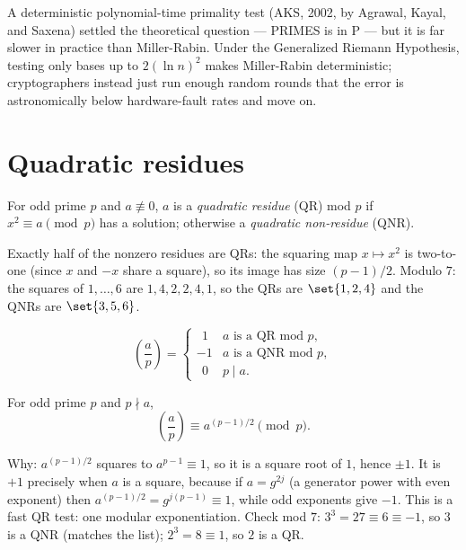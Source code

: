 \begin{historybox}
A deterministic polynomial-time primality test (AKS, 2002, by Agrawal, Kayal, and Saxena) settled the
theoretical question --- PRIMES is in P --- but it is far slower in practice than Miller-Rabin. Under
the Generalized Riemann Hypothesis, testing only bases up to $2(\ln n)^2$ makes Miller-Rabin
deterministic; cryptographers instead just run enough random rounds that the error is astronomically
below hardware-fault rates and move on.
\end{historybox}

\section{Quadratic residues}
\label{ch40:qr}

\begin{definition}
\label{ch40:def-qr}
For odd prime $p$ and $a\not\equiv 0$, $a$ is a \emph{quadratic residue} (QR) mod $p$ if $x^2\equiv a
\pmod p$ has a solution; otherwise a \emph{quadratic non-residue} (QNR).
\end{definition}

Exactly half of the nonzero residues are QRs: the squaring map $x\mapsto x^2$ is two-to-one (since
$x$ and $-x$ share a square), so its image has size $(p-1)/2$. Modulo $7$: the squares of
$1,\dots,6$ are $1,4,2,2,4,1$, so the QRs are $\set{1,2,4}$ and the QNRs are $\set{3,5,6}$.

\begin{definition}
\label{ch40:def-legendre}
\[
  \left(\frac{a}{p}\right) =
  \begin{cases}
    \ \ 1 & a \text{ is a QR mod } p,\\
    -1 & a \text{ is a QNR mod } p,\\
    \ \ 0 & p\mid a.
  \end{cases}
\]
\end{definition}

\begin{theorem}
\label{ch40:thm-eulercrit}
For odd prime $p$ and $p\nmid a$,
\[
  \left(\frac{a}{p}\right) \equiv a^{(p-1)/2} \pmod p.
\]
\end{theorem}

Why: $a^{(p-1)/2}$ squares to $a^{p-1}\equiv 1$, so it is a square root of $1$, hence $\pm 1$. It is
$+1$ precisely when $a$ is a square, because if $a=g^{2j}$ (a generator power with even exponent) then
$a^{(p-1)/2}=g^{j(p-1)}\equiv 1$, while odd exponents give $-1$. This is a fast QR test: one modular
exponentiation. Check mod $7$: $3^{3}=27\equiv 6\equiv -1$, so $3$ is a QNR (matches the list);
$2^{3}=8\equiv 1$, so $2$ is a QR.

